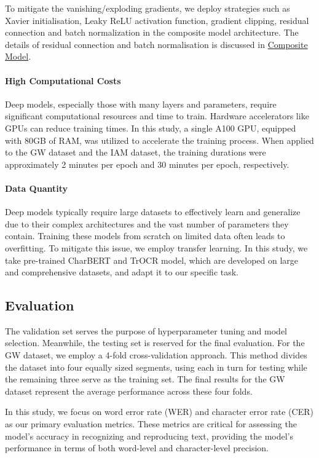 To mitigate the vanishing/exploding gradients, we deploy strategies such as Xavier initialisation, Leaky ReLU activation function, gradient clipping, residual connection and batch normalization in the composite model architecture. The details of residual connection and batch normalisation is discussed in \hyperref[subsec:3_composite_model]{Composite Model}.

\paragraph*{High Computational Costs}
\label{par:4_high_computational_costs}
Deep models, especially those with many layers and parameters, require significant computational resources and time to train. Hardware accelerators like GPUs can reduce training times. In this study, a single A100 GPU, equipped with 80GB of RAM, was utilized to accelerate the training process. When applied to the GW dataset and the IAM dataset, the training durations were approximately 2 minutes per epoch and 30 minutes per epoch, respectively.

\paragraph*{Data Quantity}
\label{par:4_data_quantity}
Deep models typically require large datasets to effectively learn and generalize due to their complex architectures and the vast number of parameters they contain. Training these models from scratch on limited data often leads to overfitting. To mitigate this issue, we employ transfer learning. In this study, we take pre-trained CharBERT and TrOCR model, which are developed on large and comprehensive datasets, and adapt it to our specific task. 

\subsection{Evaluation}
\label{subsec:4_evaluation}
The validation set serves the purpose of hyperparameter tuning and model selection. Meanwhile, the testing set is reserved for the final evaluation. For the GW dataset, we employ a 4-fold cross-validation approach. This method divides the dataset into four equally sized segments, using each in turn for testing while the remaining three serve as the training set. The final results for the GW dataset represent the average performance across these four folds.

In this study, we focus on word error rate (WER) and character error rate (CER) as our primary evaluation metrics. These metrics are critical for assessing the model's accuracy in recognizing and reproducing text, providing the model's performance in terms of both word-level and character-level precision.
